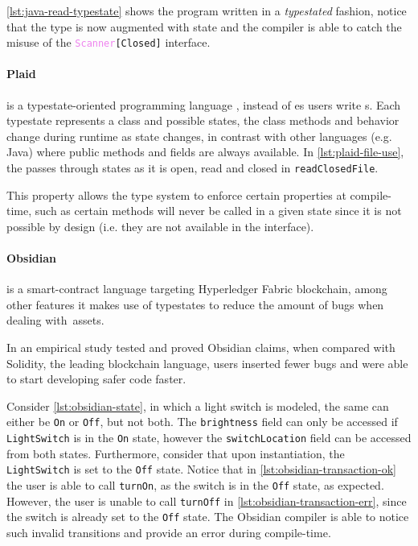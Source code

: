 \autoref{lst:java-read-typestate} shows the  program written in a \emph{typestated} fashion,
notice that the  type is now augmented with state and
the compiler is able to catch the misuse of the \texttt{\textcolor{violet}{Scanner}[Closed]} interface.



\paragraph{Plaid} is a typestate-oriented programming language \autocite{Aldrich2009},
instead of es users write s.
Each typestate represents a class and possible states,
the class methods and behavior change during runtime as state changes,
in contrast with other languages (e.g. Java) where public methods and fields are always available.
In \autoref{lst:plaid-file-use}, the  passes through states as it is open, read and closed in \texttt{readClosedFile}.

This property allows the type system to enforce certain properties at compile-time,
such as certain methods will never be called in a given state since it is not possible by design
(i.e. they are not available in the interface).



\paragraph{Obsidian} is a smart-contract language targeting Hyperledger Fabric blockchain,
among other features it makes use of typestates to reduce the amount of bugs when dealing with~assets.

In \autocite{Coblenz2020} an empirical study tested and proved Obsidian claims,
when compared with Solidity, the leading blockchain language,
users inserted fewer bugs and were able to start developing safer code faster.

Consider \autoref{lst:obsidian-state}, in which a light switch is modeled,
the same can either be \texttt{On} or \texttt{Off}, but not both.
The \texttt{brightness} field can only be accessed if \texttt{LightSwitch} is in the \texttt{On} state,
however the \texttt{switchLocation} field can be accessed from both states.
Furthermore, consider that upon instantiation, the \texttt{LightSwitch} is set to the \texttt{Off} state.
Notice that in \autoref{lst:obsidian-transaction-ok} the user is able to call \texttt{turnOn},
as the switch is in the \texttt{Off} state, as expected.
However, the user is unable to call \texttt{turnOff} in \autoref{lst:obsidian-transaction-err},
since the switch is already set to the \texttt{Off} state.
The Obsidian compiler is able to notice such invalid transitions and provide an error during compile-time.

